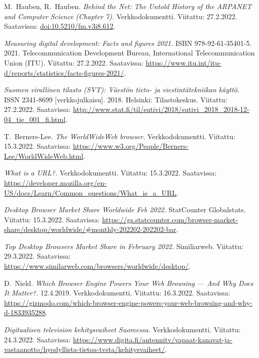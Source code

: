 \documentclass[finnish, 12pt, a4paper, elec, utf8, a-1b, online]{aaltothesis}
\begin{document}
\thesisbibliography
\begin{thebibliography}{99}

    M.\ Hauben, R.\ Hauben.
    \textit{Behind the Net: The Untold History of the ARPANET and Computer Science (Chapter 7).}
    Verkkodokumentti.
    Viitattu: 27.2.2022.
    Saatavissa: \url{doi:10.5210/fm.v3i8.612}.

    \textit{Measuring digital development: Facts and figures 2021.}
    ISBN 978-92-61-35401-5.
    2021.
    Telecommunication Development Bureau, International Telecommunication Union (ITU).
    Viitattu: 27.2.2022.
    Saatavissa: \url{https://www.itu.int/itu-d/reports/statistics/facts-figures-2021/}.

    \textit{Suomen virallinen tilasto (SVT): Väestön tieto- ja viestintätekniikan käyttö.}
    ISSN 2341-8699 [verkkojulkaisu].
    2018.
    Helsinki: Tilastokeskus.
    Viitattu: 27.2.2022.
    Saatavissa: \url{http://www.stat.fi/til/sutivi/2018/sutivi_2018_2018-12-04_tie_001_fi.html}.

    T.\ Berners-Lee.
    \textit{The WorldWideWeb browser.}
    Verkkodokumentti.
    Viitattu: 15.3.2022.
    Saatavissa: \url{https://www.w3.org/People/Berners-Lee/WorldWideWeb.html}.

    \textit{What is a URL?.}
    Verkkodokumentti.
    Viitattu: 15.3.2022.
    Saatavissa: \url{https://developer.mozilla.org/en-US/docs/Learn/Common_questions/What_is_a_URL}.

    \textit{Desktop Browser Market Share Worldwide Feb 2022.}
    StatCounter Globalstats.
    Viitattu: 15.3.2022.
    Saatavissa: \url{https://gs.statcounter.com/browser-market-share/desktop/worldwide/#monthly-202202-202202-bar}.

    \textit{Top Desktop Browsers Market Share in February 2022.}
    Similiarweb.
    Viitattu: 29.3.2022.
    Saatavissa: \url{https://www.similarweb.com/browsers/worldwide/desktop/}.

    D.\ Nield.
    \textit{Which Browser Engine Powers Your Web Browsing — And Why Does It Matter?.}
    12.4.2019.
    Verkkodokumentti.
    Viitattu: 16.3.2022.
    Saatavissa: \url{https://gizmodo.com/which-browser-engine-powers-your-web-browsing-and-why-d-1833935288}.

    \textit{Digitaalisen television kehitysvaiheet Suomessa.}
    Verkkodokumentti.
    Viitattu: 24.3.2022.
    Saatavissa: \url{https://www.digita.fi/antennitv/vapaat-kanavat-ja-vastaanotto/hyodyllista-tietoa-tvsta/kehitysvaiheet/}.


\end{thebibliography}
\end{document}
